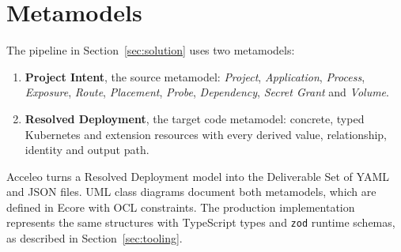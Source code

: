 \section{Metamodels}
\label{sec:metamodels}

The pipeline in Section~\ref{sec:solution} uses two metamodels:

\begin{enumerate}
  \item \textbf{Project Intent}, the source metamodel: \emph{Project}, \emph{Application},
    \emph{Process}, \emph{Exposure}, \emph{Route}, \emph{Placement},
    \emph{Probe}, \emph{Dependency}, \emph{Secret Grant} and \emph{Volume}.
  \item \textbf{Resolved Deployment}, the target code metamodel: concrete,
    typed Kubernetes and extension resources with every derived value,
    relationship, identity and output path.
\end{enumerate}

Acceleo turns a Resolved Deployment model into the Deliverable Set of YAML and
JSON files. UML class diagrams document both metamodels, which are defined in
Ecore with OCL constraints. The production implementation represents the same
structures with TypeScript types and \texttt{zod} runtime schemas, as described
in Section~\ref{sec:tooling}.
